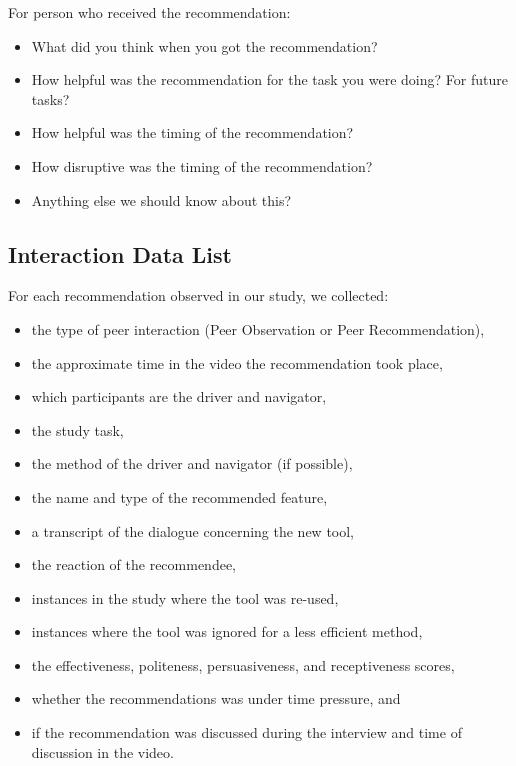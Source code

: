 \noindent
For person who received the recommendation:
\begin{itemize}
    \item What did you think when you got the recommendation?
    \item How helpful was the recommendation for the task you were doing? For future tasks?
    \item How helpful was the timing of the recommendation?
    \item How disruptive was the timing of the recommendation?
    \item Anything else we should know about this?
\end{itemize}

\subsection{Interaction Data List}
\label{app-peer-data}

For each recommendation observed in our study, we collected:

\begin{itemize}[topsep=0pt,itemsep=-1ex,partopsep=1ex,parsep=1ex]
    \item the type of peer interaction (Peer Observation or Peer Recommendation),
    \item the approximate time in the video the recommendation took place,
    \item which participants are the driver and navigator,
    \item the study task,
    \item the method of the driver and navigator (if possible),
    \item the name and type of the recommended feature,
    \item a transcript of the dialogue concerning the new tool,
    \item the reaction of the recommendee,
    \item instances in the study where the tool was re-used,
    \item instances where the tool was ignored for a less efficient method,
    \item the effectiveness, politeness, persuasiveness, and receptiveness scores, 
    \item whether the recommendations was under time pressure, and
    \item if the recommendation was discussed during the interview and time of discussion in the video.
\end{itemize}

